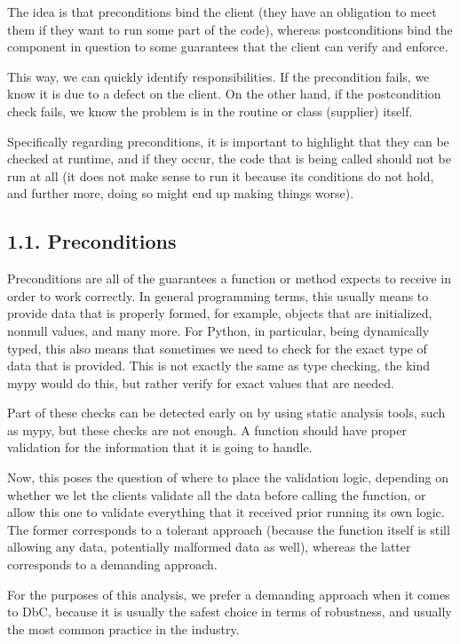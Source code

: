 \documentclass[a4paper,10pt,english]{sphinxmanual}
\begin{document}
The idea is that preconditions bind the client (they have an obligation to meet them if they want to run some part of the
code), whereas postconditions bind the component in question to some guarantees that the client can verify and
enforce.

This way, we can quickly identify responsibilities. If the precondition fails, we know it is due to a
defect on the client. On the other hand, if the postcondition check fails, we know the problem is in the
routine or class (supplier) itself.

Specifically regarding preconditions, it is important to highlight that they can be checked at runtime, and if
they occur, the code that is being called should not be run at all (it does not make sense to run it because
its conditions do not hold, and further more, doing so might end up making things worse).


\subsection{1.1. Preconditions}
\label{\detokenize{chapters/3_general_traits/index:preconditions}}
Preconditions are all of the guarantees a function or method expects to receive in order to work correctly. In
general programming terms, this usually means to provide data that is properly formed, for example, objects
that are initialized, non\sphinxhyphen{}null values, and many more. For Python, in particular, being dynamically typed, this
also means that sometimes we need to check for the exact type of data that is provided. This is not exactly
the same as type checking, the kind mypy would do this, but rather verify for exact values that are needed.

Part of these checks can be detected early on by using static analysis tools, such as mypy, but
these checks are not enough. A function should have proper validation for the information that it is going to
handle.

Now, this poses the question of where to place the validation logic, depending on whether we let the clients
validate all the data before calling the function, or allow this one to validate everything that it received
prior running its own logic. The former corresponds to a tolerant approach (because the function itself is
still allowing any data, potentially malformed data as well), whereas the latter corresponds to a demanding
approach.

For the purposes of this analysis, we prefer a demanding approach when it comes to DbC, because it is usually
the safest choice in terms of robustness, and usually the most common practice in the industry.
\end{document}
